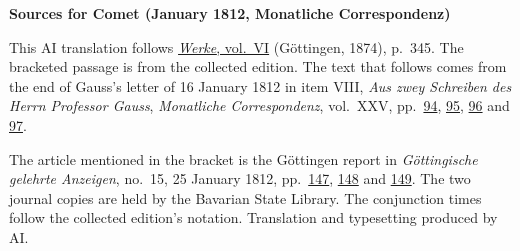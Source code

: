 \clearpage\thispagestyle{empty}
\begin{center}\textbf{Sources for Comet (January 1812, Monatliche Correspondenz)}\end{center}
\noindent This AI translation follows \href{https://gdz.sub.uni-goettingen.de/id/PPN236007467}{\textit{Werke}, vol.~VI} (Göttingen, 1874), p.~345. The bracketed passage is from the collected edition. The text that follows comes from the end of Gauss’s letter of 16 January 1812 in item VIII, \textit{Aus zwey Schreiben des Herrn Professor Gauss}, \textit{Monatliche Correspondenz}, vol.~XXV, pp.~\href{https://api.digitale-sammlungen.de/iiif/image/v2/bsb10538614_00100/full/1600,/0/default.jpg}{94}, \href{https://api.digitale-sammlungen.de/iiif/image/v2/bsb10538614_00101/full/1600,/0/default.jpg}{95}, \href{https://api.digitale-sammlungen.de/iiif/image/v2/bsb10538614_00102/full/1600,/0/default.jpg}{96} and \href{https://api.digitale-sammlungen.de/iiif/image/v2/bsb10538614_00103/full/1600,/0/default.jpg}{97}.
\par\smallskip\noindent The article mentioned in the bracket is the Göttingen report in \textit{Göttingische gelehrte Anzeigen}, no.~15, 25 January 1812, pp.~\href{https://api.digitale-sammlungen.de/iiif/image/v2/bsb10538681_00191/full/1600,/0/default.jpg}{147}, \href{https://api.digitale-sammlungen.de/iiif/image/v2/bsb10538681_00192/full/1600,/0/default.jpg}{148} and \href{https://api.digitale-sammlungen.de/iiif/image/v2/bsb10538681_00193/full/1600,/0/default.jpg}{149}. The two journal copies are held by the Bavarian State Library. The conjunction times follow the collected edition’s notation. Translation and typesetting produced by AI.
\clearpage
